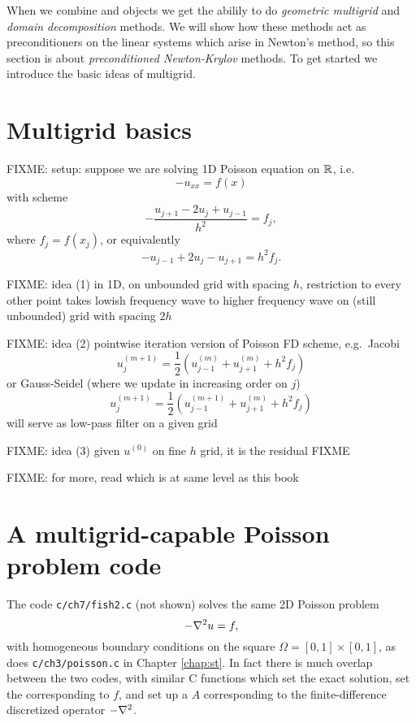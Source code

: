 
When we combine \PETSc \pDMDA and \pSNES objects we get the abilily to do \emph{geometric multigrid} \citep{Briggsetal2000,Trottenbergetal2001} and \emph{domain decomposition} \citep{Smithetal1996,Doleanetal2015} methods.  We will show how these methods act as preconditioners on the linear systems which arise in Newton's method, so this section is about \emph{preconditioned Newton-Krylov} methods.  To get started we introduce the basic ideas of multigrid.


\section{Multigrid basics}

FIXME: setup: suppose we are solving 1D Poisson equation on $\mathbb{R}$, i.e.
    $$- u_{xx} = f(x)$$
with scheme
    $$- \frac{u_{j+1} - 2 u_j + u_{j-1}}{h^2} = f_j,$$
where $f_j = f(x_j)$, or equivalently
    $$- u_{j-1} + 2 u_j - u_{j+1} = h^2 f_j.$$

FIXME: idea (1) in 1D, on unbounded grid with spacing $h$, restriction to every other point takes lowish frequency wave to higher frequency wave on (still unbounded) grid with spacing $2h$

FIXME: idea (2) pointwise iteration version of Poisson FD scheme, e.g.~Jacobi
   $$u_j^{(m+1)} = \frac{1}{2} \left(u_{j-1}^{(m)} + u_{j+1}^{(m)} + h^2 f_j\right) $$
or Gauss-Seidel (where we update in increasing order on $j$)
   $$u_j^{(m+1)} = \frac{1}{2} \left(u_{j-1}^{(m+1)} + u_{j+1}^{(m)} + h^2 f_j\right) $$
will serve as low-pass filter on a given grid

FIXME: idea (3) given $u^{(0)}$ on fine $h$ grid, it is the residual FIXME

FIXME: for more, read \citep{Briggsetal2000} which is at same level as this book


\section{A multigrid-capable Poisson problem code}

The code \texttt{c/ch7/fish2.c} (not shown) solves the same 2D Poisson problem
    $$-\nabla^2 u = f,$$
with homogeneous boundary conditions on the square $\Omega=[0,1]\times[0,1]$, as does \texttt{c/ch3/poisson.c} in Chapter \ref{chap:st}.  In fact there is much overlap between the two codes, with similar C functions which set the exact solution, set the \pVec corresponding to $f$, and set up a \pMat $A$ corresponding to the finite-difference discretized operator $-\nabla^2$.

